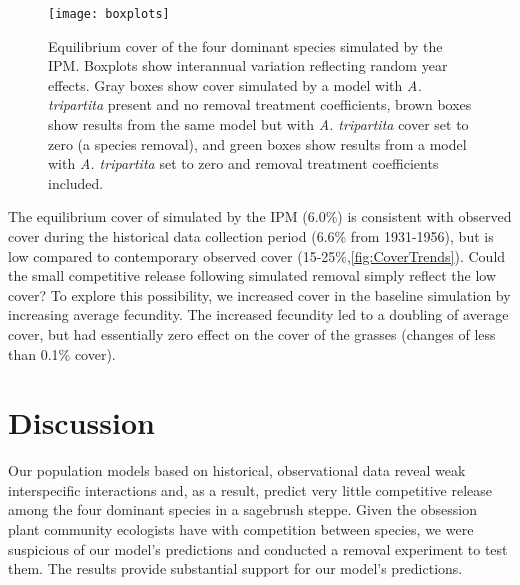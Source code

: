 \documentclass[11pt]{article}
\begin{document}
\begin{doublespacing}
 \begin{figure}[tbp]
 \centering
 \texttt{[image: boxplots]}
 \caption{Equilibrium cover of the four dominant species simulated by the IPM. Boxplots show interannual variation reflecting random year effects. Gray boxes show cover simulated by a model with \textit{A. tripartita} present and no removal treatment coefficients, brown boxes show results from the same model but with \textit{A. tripartita} cover set to zero (a species removal), and green boxes show results from a model with  \textit{A. tripartita} set to zero and removal treatment coefficients included.  }
 \label{fig:IPMresults}
 \end{figure}
 
 The equilibrium cover of  simulated by the IPM (6.0\%) is consistent with observed cover during the historical data collection period (6.6\% from 1931-1956), but is low compared to contemporary observed cover (15-25\%,\ref{fig:CoverTrends}). Could the small competitive release following simulated  removal simply reflect the low  cover? To explore this possibility, we increased  cover in the baseline simulation by increasing average  fecundity. The increased fecundity led to a doubling of  average cover, but had essentially zero effect on the cover of the grasses (changes of less than 0.1\% cover). 

\section*{Discussion}

Our population models based on historical, observational data reveal weak interspecific interactions \citep{adler_coexistence_2010,chu_large_2015} and, as a result, predict very little competitive release among the four dominant species in a sagebrush steppe. Given the obsession plant community ecologists have with competition between species, we were suspicious of our model's predictions and conducted a removal experiment to test them. The results provide substantial support for our model's predictions.


\end{doublespacing}
\end{document}
